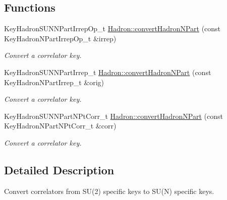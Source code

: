 \subsection*{Functions}
\begin{DoxyCompactItemize}
\item 
Key\+Hadron\+S\+U\+N\+N\+Part\+Irrep\+Op\+\_\+t \mbox{\hyperlink{namespaceHadron_ac6bc3e869d76d287be23c6d20cb9c104}{Hadron\+::convert\+Hadron\+N\+Part}} (const Key\+Hadron\+N\+Part\+Irrep\+Op\+\_\+t \&irrep)
\begin{DoxyCompactList}\small\item\em Convert a correlator key. \end{DoxyCompactList}\item 
Key\+Hadron\+S\+U\+N\+N\+Part\+Irrep\+\_\+t \mbox{\hyperlink{namespaceHadron_a870585feaeca280be18774aa6242e2e9}{Hadron\+::convert\+Hadron\+N\+Part}} (const Key\+Hadron\+N\+Part\+Irrep\+\_\+t \&orig)
\begin{DoxyCompactList}\small\item\em Convert a correlator key. \end{DoxyCompactList}\item 
Key\+Hadron\+S\+U\+N\+N\+Part\+N\+Pt\+Corr\+\_\+t \mbox{\hyperlink{namespaceHadron_af69200410e93c702cf9e19f0c220bbef}{Hadron\+::convert\+Hadron\+N\+Part}} (const Key\+Hadron\+N\+Part\+N\+Pt\+Corr\+\_\+t \&corr)
\begin{DoxyCompactList}\small\item\em Convert a correlator key. \end{DoxyCompactList}\end{DoxyCompactItemize}


\subsection{Detailed Description}
Convert correlators from S\+U(2) specific keys to S\+U(\+N) specific keys. 

